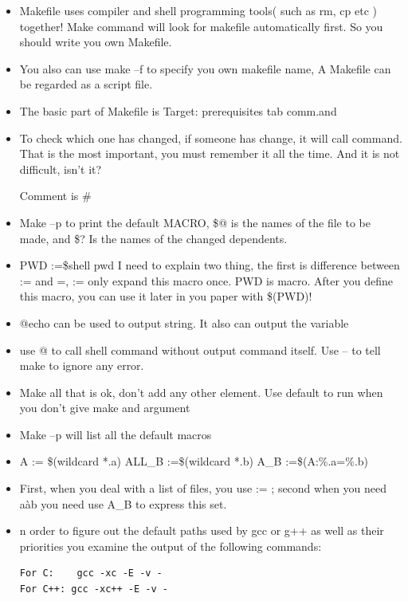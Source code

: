 \documentclass[a4paper,12pt,twoside]{book}
\begin{document}
	\begin{itemize}
		\item Makefile uses compiler and shell programming tools( such as rm, cp etc ) together!
		Make command will look for makefile automatically first. So you should write you own Makefile.
		\item You also can use make –f to specify you own makefile name,
		A Makefile can be regarded as a script file.

		\item The basic part of Makefile is Target: prerequisites
                        tab comm.and
		\item To check which one has changed, if someone has change, it will call command.
That is the most important, you must remember it all the time.  And it is not difficult, isn't it?

		Comment is \#
		\item Make –p to print the default MACRO, \$@ is the names of the file to be made, and \$? Is the names of
the changed dependents.

		\item PWD :=\${shell pwd} I need to explain two thing, the first is difference between := and =, := only
expand this macro once.    PWD is macro. After you define this macro, you can use it later in you paper with
\$(PWD)!

		\item @echo can be used to output string. It also can output the variable
		\item use @ to call shell command without output command itself. Use – to tell make to ignore any error.
		\item Make all that is ok, don’t add any other element. Use default to run when you don’t give make and argument
		\item Make –p will list all the default macros
		\item A := \$(wildcard *.a)  ALL\_B :=\$(wildcard *.b)  A\_B :=\$(A:\%.a=\%.b)
		\item First, when you deal with a list of files, you use := ; second when you need aàb you need use A\_B to express this set.
		\item n order to figure out the default paths used by gcc or g++ as well as their priorities you examine the output of the following commands:
\begin{verbatim}
For C:    gcc -xc -E -v -
For C++: gcc -xc++ -E -v -
\end{verbatim}

\end{itemize}
\end{document}
